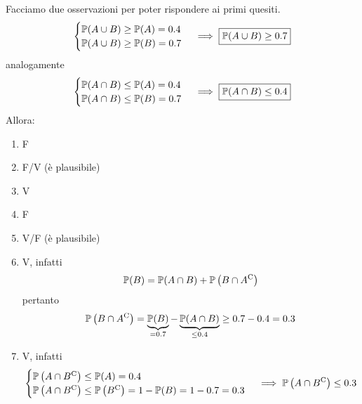 Facciamo due osservazioni per poter rispondere ai primi quesiti.
\begin{equation*}
	\begin{cases}
		\mathbb{P}(A\cup B) \geq \mathbb{P}(A) =0.4\\
		\mathbb{P}(A\cup B) \geq \mathbb{P}(B) =0.7
	\end{cases}
	\implies \boxed{\mathbb{P}( A\cup B) \geq 0.7}
\end{equation*}
analogamente
\begin{equation*}
	\begin{cases}
		\mathbb{P}( A\cap B) \leq \mathbb{P}( A) =0.4\\
		\mathbb{P}( A\cap B) \leq \mathbb{P}( B) =0.7
	\end{cases}
	\implies \boxed{\mathbb{P}( A\cap B) \leq 0.4}
\end{equation*}
Allora:
\begin{enumerate}
	\item F
	\item F/V (è plausibile)
	\item V
	\item F
	\item V/F (è plausibile)
	\item V, infatti
	\begin{equation*}
		\mathbb{P}( B) =\mathbb{P}( A\cap B) +\mathbb{P}\left( B\cap A^{\mathrm{C}}\right)
	\end{equation*}
	pertanto
	\begin{equation*}
		\mathbb{P}\left( B\cap A^{\mathrm{C}}\right) =\underbrace{\mathbb{P}( B)}_{=0.7} -\underbrace{\mathbb{P}( A\cap B)}_{\leq 0.4} \geq 0.7-0.4=0.3
	\end{equation*}
	\item V, infatti
	\begin{equation*}
		\begin{cases}
			\mathbb{P}\left( A\cap B^{\mathrm{C}}\right) \leq \mathbb{P}( A) =0.4\\
			\mathbb{P}\left( A\cap B^{\mathrm{C}}\right) \leq \mathbb{P}\left( B^{\mathrm{C}}\right) =1-\mathbb{P}( B) =1-0.7=0.3
		\end{cases}
		\implies \mathbb{P}\left( A\cap B^{\mathrm{C}}\right) \leq 0.3
	\end{equation*}
\end{enumerate}

\Soluzione

